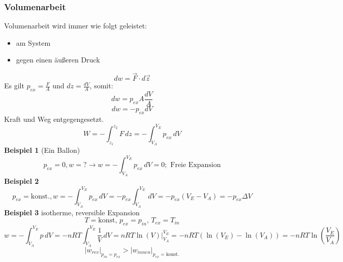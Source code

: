 \documentclass[a4paper]{article}
\begin{document}
\subsubsection{Volumenarbeit}
Volumenarbeit wird immer wie folgt geleistet:
\begin{itemize}
    \item am System
    \item gegen einen äußeren Druck
\end{itemize}
\begin{equation*}
    dw = \vec{F} \cdot d\vec{z}
\end{equation*}
Es gilt $p_{ex} = \frac{F}{A}$ und $dz = \frac{dV}{A}$, somit:
\begin{equation*}
    dw = p_{ex}A \frac{dV}{A}
\end{equation*}
\begin{equation*}
    dw = -p_{ex} dV
\end{equation*}
Kraft und Weg entgegengesetzt.
\begin{equation*}
    W = - \int_{z_1}^{z_2} F\,dz = - \int_{V_A}^{V_E} p_{ex} \,dV 
\end{equation*}
\textbf{Beispiel 1} (Ein Ballon)
\begin{equation*}
    p_{ex} = 0, w = ? \rightarrow w = - \int_{V_A}^{V_E} p_{ex} \, dV = 0; \text{ Freie Expansion}
\end{equation*}
\textbf{Beispiel 2}
\begin{equation*}
    p_{ex} = \text{konst.}, w = -\int_{V_A}^{V_E} p_{ex} \, dV = - p_{ex} \int_{V_A}^{V_E} \, dV = -p_{ex}(V_E-V_A) = -p_{ex}\Delta V
\end{equation*}
\textbf{Beispiel 3} isotherme, reversible Expansion
\begin{equation*}
    T = \text{konst},\,p_{ex}=p_{in},\,T_{ex} = T_{in}
\end{equation*}
\begin{equation*}
    w = -\int_{V_A}^{V_E}p\,dV = -nRT \int_{V_A}^{V_E} \frac{1}{V} \,dV = nRT \ln(V) \vert_{V_A}^{V_E} = -nRT(\ln(V_E)-\ln(V_A)) = -nRT\ln\left(\frac{V_E}{V_A}\right)
\end{equation*}
\begin{equation*}
    |w_{rev}|_{p_{in} = p_{ex}} > |w_{innen}|_{p_{ex}=\text{konst.}}
\end{equation*}
\end{document}
